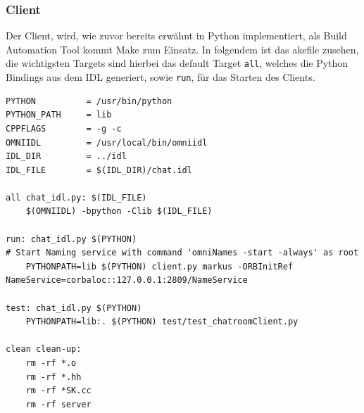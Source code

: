 \subsubsection{Client}
Der Client, wird, wie zuvor bereits erw\"ahnt in Python implementiert, als Build Automation Tool kommt Make zum Einsatz.
In folgendem ist das akefile zusehen, die wichtigsten Targets sind hierbei das default Target \texttt{all}, welches die Python Bindings aus dem IDL generiert, sowie \texttt{run}, f\"ur das Starten des Clients.
\begin{lstlisting}[language=Make, caption=Makefile des Clients]
PYTHON         	= /usr/bin/python
PYTHON_PATH     = lib
CPPFLAGS      	= -g -c
OMNIIDL       	= /usr/local/bin/omniidl
IDL_DIR		    = ../idl
IDL_FILE	    = $(IDL_DIR)/chat.idl

all chat_idl.py: $(IDL_FILE)
	$(OMNIIDL) -bpython -Clib $(IDL_FILE)

run: chat_idl.py $(PYTHON)
# Start Naming service with command 'omniNames -start -always' as root
	PYTHONPATH=lib $(PYTHON) client.py markus -ORBInitRef NameService=corbaloc::127.0.0.1:2809/NameService

test: chat_idl.py $(PYTHON)
	PYTHONPATH=lib:. $(PYTHON) test/test_chatroomClient.py

clean clean-up:
	rm -rf *.o
	rm -rf *.hh
	rm -rf *SK.cc
	rm -rf server
\end{lstlisting}

